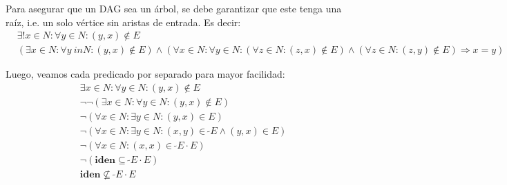 \documentclass{article}
\newcommand{\iden}{\textbf{iden}}
\newcommand{\conv}[1]{\ \tilde{}#1}
\begin{document}
Para asegurar que un DAG sea un árbol, se debe garantizar que este tenga una raíz, i.e. un solo vértice sin aristas de entrada.
Es decir:
\begin{equation*}
  \begin{aligned}
    &\exists! x \in N : \forall y \in N : (y, x) \notin E \\ 
    &(\exists x \in N : \forall y \ in N : (y, x) \notin E) \land (\forall x \in N : \forall y \in N : (\forall z \in N : (z, x) \notin E) \land (\forall z \in N : (z, y) \notin E) \Rightarrow x = y)
  \end{aligned}
\end{equation*}

Luego, veamos cada predicado por separado para mayor facilidad:
\begin{equation*}
  \begin{aligned}
    &\exists x \in N : \forall y \in N : (y, x) \notin E \\ 
    &\neg\neg(\exists x \in N : \forall y \in N : (y, x) \notin E) \\ 
    &\neg(\forall x \in N : \exists y \in N : (y, x) \in E) \\ 
    &\neg(\forall x \in N : \exists y \in N : (x, y) \in \conv{E} \land (y, x) \in E) \\ 
    &\neg(\forall x \in N : (x, x) \in \conv{E} \cdot E) \\ 
    &\neg(\iden \subseteq \conv{E} \cdot E) \\ 
    &\iden \not\subseteq \conv{E} \cdot E
  \end{aligned}
\end{equation*}
\end{document}
